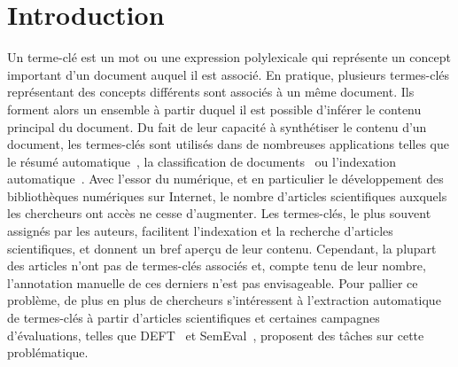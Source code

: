 \section{Introduction}
\label{sec:introduction}
  Un terme-clé est un mot ou une expression polylexicale qui représente un
  concept important d'un document auquel il est associé. En pratique, plusieurs
  termes-clés représentant des concepts différents sont associés à un même
  document. Ils forment alors un ensemble à partir duquel il est
  possible d'inférer le contenu principal du document. Du fait de leur capacité
  à synthétiser le contenu d'un document, les termes-clés sont utilisés dans
  de nombreuses applications telles que le résumé
  automatique~\cite{avanzo2005keyphrase}, la classification de
  documents~\cite{han2007webdocumentclustering} ou l'indexation
  automatique~\cite{medelyan2008smalltrainingset}.
  Avec l'essor du numérique, et en particulier le développement des bibliothèques numériques sur Internet, le nombre d'articles scientifiques auxquels les chercheurs ont accès ne cesse d'augmenter.
  Les termes-clés, le plus souvent assignés par les auteurs, facilitent l'indexation et la recherche d'articles scientifiques, et donnent un bref aperçu de leur contenu.
  Cependant, la plupart des articles n'ont pas de termes-clés associés et, compte tenu de leur nombre, l'annotation manuelle de ces derniers n'est pas envisageable.
  Pour pallier ce problème, de plus en plus de chercheurs s'intéressent à l'extraction automatique de termes-clés à partir d'articles scientifiques et certaines campagnes d'évaluations, telles que DEFT~\cite{paroubek2012deft} et SemEval~\cite{kim2010semeval}, proposent des tâches sur cette problématique.

